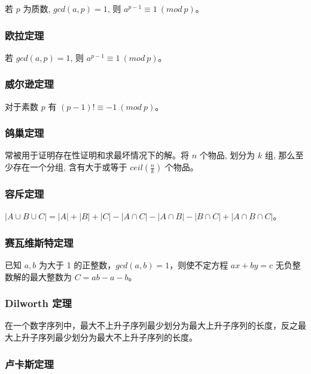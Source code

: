 \documentclass[a4paper,12pt]{article}
\begin{document}
\noindent 若 \(p\) 为质数, \(gcd(a,p) = 1\), 则 \(a^{p-1} \equiv 1 \ (mod \ p)\)。

\subsubsection{欧拉定理}

\noindent 若 \(gcd(a,p)=1\), 则 \(a^{p-1} \equiv 1 \ (mod \ p)\)。

\subsubsection{威尔逊定理}

\noindent 对于素数 \(p\) 有 \((p-1)! \equiv -1 \ (mod \ p)\)。

\subsubsection{鸽巢定理}

\noindent 常被用于证明存在性证明和求最坏情况下的解。将 \(n\) 个物品, 划分为 \(k\) 组, 
那么至少存在一个分组, 含有大于或等于 \(ceil(\frac{n}{k})\) 个物品。

\subsubsection{容斥定理}

\noindent \(|A \cup B \cup C| = |A| + |B| + |C| - |A \cap C| - |A \cap B| - |B \cap C| + |A \cap B \cap C|\)。

\subsubsection{赛瓦维斯特定理}

\noindent 已知 \(a, b\) 为大于 1 的正整数，\(gcd(a,b)=1\)，则使不定方程 \(ax + by = c\) 无负整数解的最大整数为 \(C = ab - a - b\)。

\subsubsection{Dilworth 定理}

\noindent 在一个数字序列中，最大不上升子序列最少划分为最大上升子序列的长度，反之最大上升子序列最少划分为最大不上升子序列的长度。

\subsubsection{卢卡斯定理}
\end{document}

